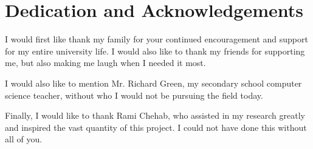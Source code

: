 \documentclass[ oneside,%
                    author={Joshua Felmeden},
                    degree={MEng},
                     title={Sentiment Analysis of Financial Headlines Based on Realised Stock Returns},
                  subtitle={Research}]{dissertation}
\begin{document}


\chapter*{Dedication and Acknowledgements}



I would first like thank my family for your continued encouragement and support for my entire university life. I would also like to thank my friends for supporting me, but also making me laugh when I needed it most.

I would also like to mention Mr. Richard Green, my secondary school computer science teacher, without who I would not be pursuing the field today.

Finally, I would like to thank Rami Chehab, who assisted in my research greatly and inspired the vast quantity of this project. I could not have done this without all of you.








\end{document}
